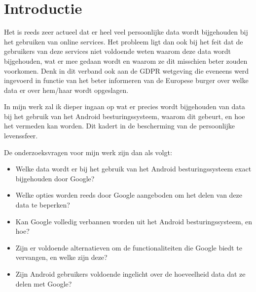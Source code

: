 
\section{Introductie} %
\label{sec:introductie}



Het is reeds zeer actueel dat er heel veel persoonlijke data wordt bijgehouden bij het gebruiken van online services. Het probleem ligt dan ook bij het feit dat de gebruikers van deze services niet voldoende weten waarom deze data wordt bijgehouden, wat er mee gedaan wordt en waarom ze dit misschien beter zouden voorkomen. Denk in dit verband ook aan de GDPR wetgeving die eveneens werd ingevoerd in functie van het beter informeren van de Europese burger over welke data er over hem/haar wordt opgeslagen. 

\vspace{2mm}

In mijn werk zal ik dieper ingaan op wat er precies wordt bijgehouden van data bij het gebruik van het Android besturingssysteem, waarom dit gebeurt, en hoe het vermeden kan worden. Dit kadert in de bescherming van de persoonlijke levenssfeer. 

\vspace{2mm}

\noindent De onderzoeksvragen voor mijn werk zijn dan als volgt:


\begin{itemize}
  \item Welke data wordt er bij het gebruik van het Android besturingssysteem exact bijgehouden door Google?
  \item Welke opties worden reeds door Google aangeboden om het delen van deze data te beperken?
  \item Kan Google volledig verbannen worden uit het Android besturingssysteem, en hoe?
  \item Zijn er voldoende alternatieven om de functionaliteiten die Google biedt te vervangen, en welke zijn deze?
  \item Zijn Android gebruikers voldoende ingelicht over de hoeveelheid data dat ze delen met Google?
\end{itemize}


